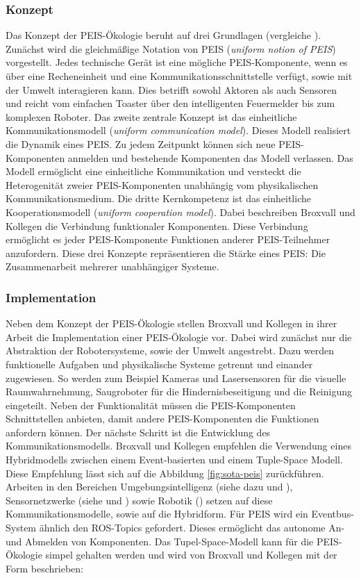\subsubsection{Konzept}
Das Konzept der PEIS-Ökologie beruht auf drei Grundlagen (vergleiche \cite{Saffiotti:2005:PEA:1107548.1107615}). Zunächst wird die gleichmäßige Notation von PEIS (\textit{uniform notion of PEIS}) vorgestellt. Jedes technische Gerät ist eine mögliche PEIS-Komponente, wenn es über eine Recheneinheit und eine Kommunikationsschnittstelle verfügt, sowie mit der Umwelt interagieren kann. Dies betrifft sowohl Aktoren als auch Sensoren und reicht vom einfachen Toaster über den intelligenten Feuermelder bis zum komplexen Roboter. Das zweite zentrale Konzept ist das einheitliche Kommunikationsmodell (\textit{uniform communication model}). Dieses Modell realisiert die Dynamik eines PEIS. Zu jedem Zeitpunkt können sich neue PEIS-Komponenten anmelden und bestehende Komponenten das Modell verlassen. Das Modell ermöglicht eine einheitliche Kommunikation und versteckt die Heterogenität zweier PEIS-Komponenten unabhängig vom physikalischen Kommunikationsmedium. \citep{Saffiotti:2005:PEA:1107548.1107615} Die dritte Kernkompetenz ist das einheitliche Kooperationsmodell (\textit{uniform cooperation model}). Dabei beschreiben Broxvall und Kollegen die Verbindung funktionaler Komponenten. Diese Verbindung ermöglicht es jeder PEIS-Komponente Funktionen anderer PEIS-Teilnehmer anzufordern. Diese drei Konzepte repräsentieren die Stärke eines PEIS: Die Zusammenarbeit mehrerer unabhängiger Systeme. 

\subsubsection{Implementation}
\label{sec:peis-imple}
Neben dem Konzept der PEIS-Ökologie stellen Broxvall und Kollegen in ihrer Arbeit die Implementation einer PEIS-Ökologie vor. Dabei wird zunächst nur die Abstraktion der Robotersysteme, sowie der Umwelt angestrebt. Dazu werden funktionelle Aufgaben und physikalische Systeme getrennt und einander zugewiesen. So werden zum Beispiel Kameras und Lasersensoren für die visuelle Raumwahrnehmung, Saugroboter für die Hindernisbeseitigung und die Reinigung eingeteilt. Neben der Funktionalität müssen die PEIS-Komponenten Schnittstellen anbieten, damit andere PEIS-Komponenten die Funktionen anfordern können. Der nächste Schritt ist die Entwicklung des Kommunikationsmodells. Broxvall und Kollegen empfehlen die Verwendung eines Hybridmodells zwischen einem Event-basierten und einem Tuple-Space Modell. Diese Empfehlung lässt sich auf die Abbildung \ref{fig:sota-peis} zurückführen. Arbeiten in den Bereichen Umgebungsintelligenz (siehe dazu \cite{arregui2003stitch} und \cite{siegemund2004context}), Sensornetzwerke (siehe \cite{adjie1999design} und \cite{heidemann2001building}) sowie Robotik (\cite{caceres2003real}) setzen auf diese Kommunikationsmodelle, sowie auf die Hybridform. Für PEIS wird ein Eventbus-System ähnlich den ROS-Topics gefordert. Dieses ermöglicht das autonome An- und Abmelden von Komponenten. Das Tupel-Space-Modell kann für die PEIS-Ökologie simpel gehalten werden und wird von Broxvall und Kollegen mit der Form beschrieben:

